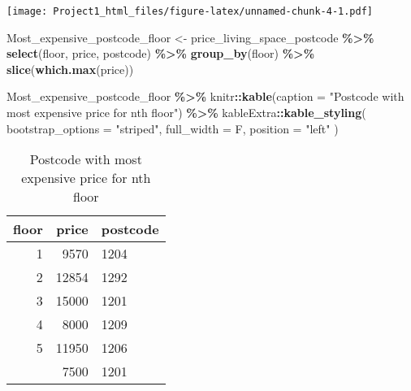 \documentclass[
]{article}
\newenvironment{Shaded}{\begin{snugshade}}{\end{snugshade}}
\newcommand{\AttributeTok}[1]{\textcolor[rgb]{0.13,0.29,0.53}{#1}}
\newcommand{\FunctionTok}[1]{\textcolor[rgb]{0.13,0.29,0.53}{\textbf{#1}}}
\newcommand{\NormalTok}[1]{#1}
\newcommand{\OtherTok}[1]{\textcolor[rgb]{0.56,0.35,0.01}{#1}}
\newcommand{\SpecialCharTok}[1]{\textcolor[rgb]{0.81,0.36,0.00}{\textbf{#1}}}
\newcommand{\StringTok}[1]{\textcolor[rgb]{0.31,0.60,0.02}{#1}}
\begin{document}
\texttt{[image: Project1\_html\_files/figure-latex/unnamed-chunk-4-1.pdf]}

\begin{Shaded}
\begin{Highlighting}[]
\NormalTok{Most\_expensive\_postcode\_floor }\OtherTok{\textless{}{-}}\NormalTok{ price\_living\_space\_postcode }\SpecialCharTok{\%\textgreater{}\%}
  \FunctionTok{select}\NormalTok{(floor, price, postcode) }\SpecialCharTok{\%\textgreater{}\%}
  \FunctionTok{group\_by}\NormalTok{(floor) }\SpecialCharTok{\%\textgreater{}\%}
  \FunctionTok{slice}\NormalTok{(}\FunctionTok{which.max}\NormalTok{(price))}

\NormalTok{Most\_expensive\_postcode\_floor }\SpecialCharTok{\%\textgreater{}\%}
\NormalTok{  knitr}\SpecialCharTok{::}\FunctionTok{kable}\NormalTok{(}\AttributeTok{caption =} \StringTok{"Postcode with most expensive price for nth floor"}\NormalTok{) }\SpecialCharTok{\%\textgreater{}\%}
\NormalTok{  kableExtra}\SpecialCharTok{::}\FunctionTok{kable\_styling}\NormalTok{(}
    \AttributeTok{bootstrap\_options =} \StringTok{"striped"}\NormalTok{,}
    \AttributeTok{full\_width =}\NormalTok{ F,}
    \AttributeTok{position =} \StringTok{"left"}
\NormalTok{  )}
\end{Highlighting}
\end{Shaded}

\begin{longtable}[l]{rrl}
\caption{\label{tab:unnamed-chunk-4}Postcode with most expensive price for nth floor}\\
\toprule
floor & price & postcode\\
\midrule
1 & 9570 & 1204\\
2 & 12854 & 1292\\
3 & 15000 & 1201\\
4 & 8000 & 1209\\
5 & 11950 & 1206\\
\addlinespace
6 & 7500 & 1201\\
\bottomrule
\end{longtable}
\end{document}
